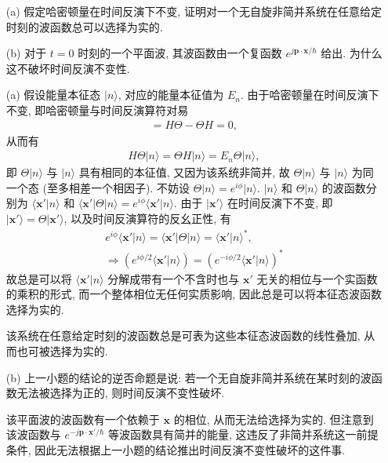 \documentclass{assignment}
\begin{document}
\begin{prob}[课本习题 4.8]
    \begin{itemize}
        \item[(a)] 假定哈密顿量在时间反演下不变, 证明对一个无自旋非简并系统在任意给定时刻的波函数总可以选择为实的.
        \item[(b)] 对于 $t=0$ 时刻的一个平面波, 其波函数由一个复函数 $e^{j\bm{p}\cdot\bm{x}/\hbar}$ 给出. 为什么这不破坏时间反演不变性.
    \end{itemize}
\end{prob}
\begin{pf}
    \begin{itemize}
        \item[(a)] 假设能量本征态 $\lvert n\rangle$, 对应的能量本征值为 $E_n$. 由于哈密顿量在时间反演下不变, 即哈密顿量与时间反演算符对易
        \begin{align}
            [H,\Theta]=H\Theta-\Theta H=0,
        \end{align}
        从而有
        \begin{align}
            H\Theta\lvert n\rangle=\Theta H\lvert n\rangle=E_n\Theta\lvert n\rangle,
        \end{align}
        即 $\Theta\lvert n\rangle$ 与 $\lvert n\rangle$ 具有相同的本征值, 又因为该系统非简并, 故 $\Theta\lvert n\rangle$ 与 $\lvert n\rangle$ 为同一个态 (至多相差一个相因子).
        不妨设 $\Theta\lvert n\rangle=e^{i\phi}\lvert n\rangle$.
        $\lvert n\rangle$ 和 $\Theta\lvert n\rangle$ 的波函数分别为 $\langle\bm{x}'\vert n\rangle$ 和 $\langle\bm{x}'\rvert\Theta\lvert n\rangle=e^{i\phi}\langle\bm{x}'\vert n\rangle$.
        由于 $\lvert\bm{x}'\rangle$ 在时间反演下不变, 即 $\lvert\bm{x}'\rangle=\Theta\lvert\bm{x}'\rangle$, 以及时间反演算符的反幺正性, 有
        \begin{gather}
            e^{i\phi}\langle\bm{x}'\vert n\rangle=\langle\bm{x}'\rvert\Theta\lvert n\rangle=\langle\bm{x}'\vert n\rangle^*,\\
            \Longrightarrow(e^{i\phi/2}\langle\bm{x}'\vert n\rangle)=(e^{-i\phi/2}\langle\bm{x}'\rvert n\rangle)^*
        \end{gather}
        故总是可以将 $\langle\bm{x}'\vert n\rangle$ 分解成带有一个不含时也与 $\bm{x}'$ 无关的相位与一个实函数的乘积的形式, 而一个整体相位无任何实质影响, 因此总是可以将本征态波函数选择为实的.

        该系统在任意给定时刻的波函数总是可表为这些本征态波函数的线性叠加, 从而也可被选择为实的.
        \item[(b)] 上一小题的结论的逆否命题是说: 若一个无自旋非简并系统在某时刻的波函数无法被选择为正的, 则时间反演不变性破坏.

        该平面波的波函数有一个依赖于 $\bm{x}$ 的相位, 从而无法给选择为实的.
        但注意到该波函数与 $e^{-j\bm{p}\cdot\bm{x}'/\hbar}$ 等波函数具有简并的能量, 这违反了非简并系统这一前提条件, 因此无法根据上一小题的结论推出时间反演不变性破坏的这件事.
    \end{itemize}
\end{pf}
\end{document}
